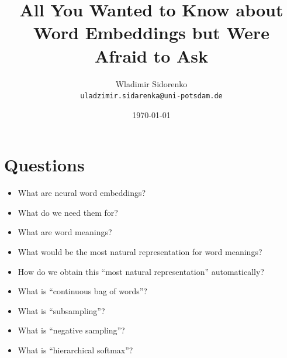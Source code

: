 \documentclass{beamer}
\title[Word Embeddings]{All You Wanted to Know about Word Embeddings but Were Afraid to Ask}
\author[Sidorenko]{Wladimir Sidorenko\\ \texttt{uladzimir.sidarenka{@}uni-potsdam.de}}
\institute[Uni Potsdam]{University of Potsdam}
\date{\today}
\begin{document}
    \begin{frame}{}
      \titlepage
    \end{frame}


    \section{Questions}
    \begin{frame}{\insertsection}
      \begin{itemize}
        \item What are neural word embeddings?
        \item What do we need them for?
        \item What are word meanings?
        \item What would be the most natural representation for word meanings?
        \item How do we obtain this ``most natural representation'' automatically?
        \item What is ``continuous bag of words''?
        \item What is ``subsampling''?
        \item What is ``negative sampling''?
        \item What is ``hierarchical softmax''?
      \end{itemize}
    \end{frame}

\end{document}
